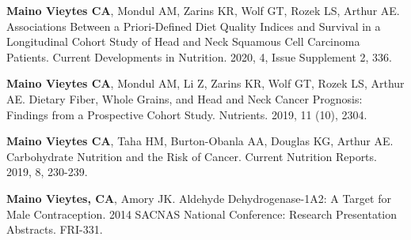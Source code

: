 \begin{cvskills}

  \cvskill
    {} %
    {\textbf{Maino Vieytes CA}, Mondul AM, Zarins KR, Wolf GT, Rozek LS, Arthur AE. Associations Between a Priori-Defined Diet Quality Indices and Survival in a Longitudinal Cohort Study of Head and Neck Squamous Cell Carcinoma Patients. Current Developments in Nutrition. 2020, 4, Issue Supplement 2, 336.} %



  \cvskill
    {} %
    {\textbf{Maino Vieytes CA}, Mondul AM, Li Z, Zarins KR, Wolf GT, Rozek LS, Arthur AE. Dietary Fiber, Whole Grains, and Head and Neck Cancer Prognosis: Findings from a Prospective Cohort Study. Nutrients. 2019, 11 (10), 2304.} %



  \cvskill
    {} %
    {\textbf{Maino Vieytes CA}, Taha HM, Burton-Obanla AA, Douglas KG, Arthur AE. Carbohydrate Nutrition and the Risk of Cancer. Current Nutrition Reports. 2019, 8, 230-239.} %



  \cvskill
    {} %
    {\textbf{Maino Vieytes, CA}, Amory JK. Aldehyde Dehydrogenase-1A2: A Target for Male Contraception. 2014 SACNAS National Conference: Research Presentation Abstracts. FRI-331.} %


\end{cvskills}

